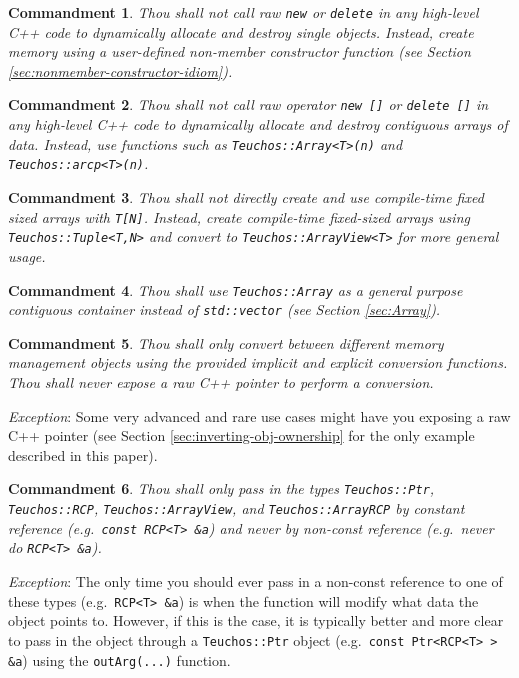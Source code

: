 \documentclass[pdf,ps2pdf,11pt]{SANDreport}
\newtheorem{commandment}{Commandment}
\begin{document}
\begin{commandment}
Thou shall not call raw {}\texttt{new} or {}\texttt{delete} in any
high-level C++ code to dynamically allocate and destroy single
objects.  Instead, create memory using a user-defined non-member
constructor function (see Section
{}\ref{sec:nonmember-constructor-idiom}).
\end{commandment}

\begin{commandment}
Thou shall not call raw operator {}\texttt{new []} or {}\texttt{delete
[]} in any high-level C++ code to dynamically allocate and destroy
contiguous arrays of data.  Instead, use functions such as
{}\texttt{Teuchos::Array<T>(n)} and {}\texttt{Teuchos::arcp<T>(n)}.
\end{commandment}

\begin{commandment}
Thou shall not directly create and use compile-time fixed sized arrays
with {}\texttt{T[N]}.  Instead, create compile-time fixed-sized arrays
using {}\texttt{Teuchos::Tuple<T,N>} and convert to
{}\texttt{Teuchos::ArrayView<T>} for more general usage.
\end{commandment}

\begin{commandment}
Thou shall use {}\texttt{Teuchos::Array} as a general purpose
contiguous container instead of {}\texttt{std::vector} (see Section
{}\ref{sec:Array}).
\end{commandment}

\begin{commandment}
Thou shall only convert between different memory management objects
using the provided implicit and explicit conversion functions.  Thou
shall never expose a raw C++ pointer to perform a conversion.
\end{commandment}
{}\textit{Exception}: Some very advanced and rare use cases might have
you exposing a raw C++ pointer (see Section
{}\ref{sec:inverting-obj-ownership} for the only example described in
this paper).

\begin{commandment}
Thou shall only pass in the types {}\texttt{Teuchos::Ptr},
{}\texttt{Teuchos::RCP}, {}\texttt{Teuchos::ArrayView}, and
{}\texttt{Teuchos::ArrayRCP} by constant reference (e.g.\
{}\texttt{const RCP<T> \&a}) and never by non-const reference (e.g.\
never do {}\texttt{RCP<T> \&a}).
\end{commandment}
{}\textit{Exception}: The only time you should ever pass in a
non-const reference to one of these types (e.g.\ {}\texttt{RCP<T>
\&a}) is when the function will modify what data the object points to.
However, if this is the case, it is typically better and more clear to
pass in the object through a {}\texttt{Teuchos::Ptr} object (e.g.\
{}\texttt{const Ptr<RCP<T> > \&a}) using the {}\texttt{outArg(...)} 
function.
\end{document}
